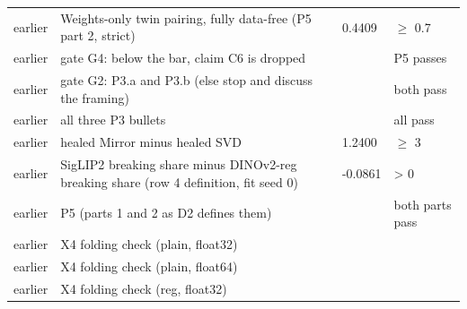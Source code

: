 \begin{table}[t]
\begin{tabular}{llll}
earlier & Weights-only twin pairing, fully data-free (P5 part 2, strict) & 0.4409 & $\ge$ 0.7 \\
earlier & gate G4: below the bar, claim C6 is dropped &  & P5 passes \\
earlier & gate G2: P3.a and P3.b (else stop and discuss the framing) &  & both pass \\
earlier & all three P3 bullets &  & all pass \\
earlier & healed Mirror minus healed SVD & 1.2400 & $\ge$ 3 \\
earlier & SigLIP2 breaking share minus DINOv2-reg breaking share (row 4 definition, fit seed 0) & -0.0861 & > 0 \\
earlier & P5 (parts 1 and 2 as D2 defines them) &  & both parts pass \\
earlier & X4 folding check (plain, float32) &  &  \\
earlier & X4 folding check (plain, float64) &  &  \\
earlier & X4 folding check (reg, float32) &  &  \\
\bottomrule
\end{tabular}
\end{table}

